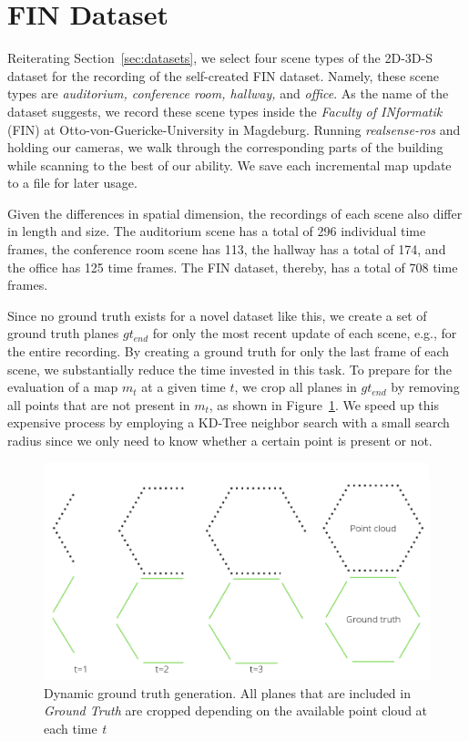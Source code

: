\documentclass[main.tex]{subfiles}
\begin{document}
\section{FIN Dataset}
\label{sec:finimpl}
Reiterating Section~\ref{sec:datasets}, we select four scene types of the 2D-3D-S dataset for the recording of the self-created FIN
dataset. Namely, these scene types are \textit{auditorium, conference room, hallway,} and \textit{office}.
As the name of the dataset suggests, we record these scene types inside the \textit{Faculty of INformatik} (FIN) at Otto-von-Guericke-University
in Magdeburg.
Running \textit{realsense-ros} and holding our cameras, we walk through the corresponding parts of the building while scanning to the best of our ability.
We save each incremental map update to a file for later usage.

Given the differences in spatial dimension, the recordings of each scene also differ in length and size.
The auditorium scene has a total of 296 individual time frames, the conference room scene has 113, the hallway has a total of
174, and the office has 125 time frames.
The FIN dataset, thereby, has a total of 708 time frames.

Since no ground truth exists for a novel dataset like this, we create a set of ground truth planes $gt_{end}$ for only the most recent update of each scene, e.g., for the entire recording.
By creating a ground truth for only the last frame of each scene, we substantially reduce the time invested in this task.
To prepare for the evaluation of a map $m_t$ at a given time $t$, we crop all planes in $gt_{end}$ by removing all points that are not present in $m_t$, as shown in
Figure~\ref{fig:dynGT}.
We speed up this expensive process by employing a KD-Tree neighbor search with a small search radius since we only need to know whether a certain point is present or not.
\begin{figure}[H]
    \centering
    \includegraphics[width=15 cm]{images/dynamic_eval.png}
    \caption[Dynamic Ground Truth Generation]{Dynamic ground truth generation. All planes that are included in \textit{Ground Truth} are cropped depending on
        the available point cloud at each time \textit{t} }
    \label{fig:dynGT}
\end{figure}
\end{document}
